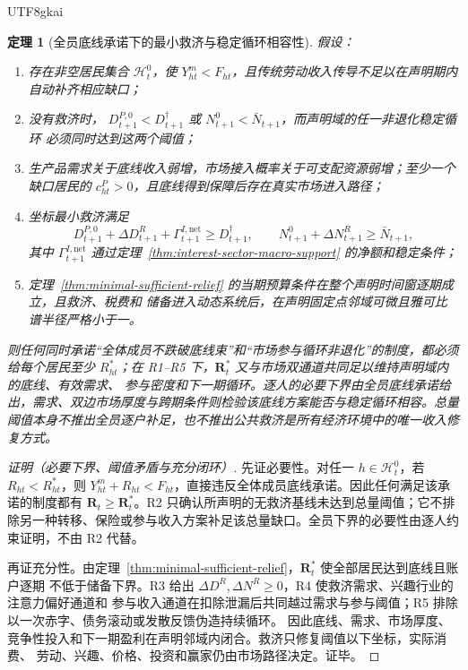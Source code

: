 \documentclass[12pt,a4paper,openany]{report}
\newtheorem{theorem}{定理}[chapter]
\begin{document}
\begin{CJK*}{UTF8}{gkai}
\begin{theorem}[全员底线承诺下的最小救济与稳定循环相容性]
\label{thm:relief-endogenous-stability}
假设：
\begin{enumerate}[label=\textup{(R\arabic*)},leftmargin=4em]
  \item 存在非空居民集合 \(\mathcal H_t^0\)，使 \(Y_{ht}^{m}<F_{ht}\)，且传统劳动收入传导不足以在声明期内
  自动补齐相应缺口；
  \item 没有救济时，
  \(D_{t+1}^{P,0}<D_{t+1}^{\dagger}\) 或 \(N_{t+1}^{0}<\bar N_{t+1}\)，而声明域的任一非退化稳定循环
  必须同时达到这两个阈值；
  \item 生产品需求关于底线收入弱增，市场接入概率关于可支配资源弱增；至少一个缺口居民的
  \(c_{ht}^{P}>0\)，且底线得到保障后存在真实市场进入路径；
  \item 坐标最小救济满足
  \[
    D_{t+1}^{P,0}+\Delta D_{t+1}^{R}
    +\Gamma_{t+1}^{I,\mathrm{net}}
    \ge D_{t+1}^{\dagger},
    \qquad
    N_{t+1}^{0}+\Delta N_{t+1}^{R}
    \ge\bar N_{t+1},
  \]
  其中 \(\Gamma_{t+1}^{I,\mathrm{net}}\) 通过定理~\ref{thm:interest-sector-macro-support} 的净额和稳定条件；
  \item 定理~\ref{thm:minimal-sufficient-relief} 的当期预算条件在整个声明时间窗逐期成立，且救济、税费和
  储备进入动态系统后，在声明固定点邻域可微且雅可比谱半径严格小于一。
\end{enumerate}
则任何同时承诺“全体成员不跌破底线束”和“市场参与循环非退化”的制度，都必须给每个居民至少
\(R_{ht}^{*}\)；在 R1--R5 下，\(\mathbf R_t^*\) 又与市场双通道共同足以维持声明域内的底线、有效需求、
参与密度和下一期循环。逐人的必要下界由全员底线承诺给出，需求、双边市场厚度与跨期条件则检验该底线方案能否与稳定循环相容。总量阈值本身不推出全员逐户补足，也不推出公共救济是所有经济环境中的唯一收入修复方式。
\end{theorem}

\begin{proof}[证明（必要下界、阈值矛盾与充分闭环）]
先证必要性。对任一 \(h\in\mathcal H_t^0\)，若 \(R_{ht}<R_{ht}^{*}\)，则
\(Y_{ht}^{m}+R_{ht}<F_{ht}\)，直接违反全体成员底线承诺。因此任何满足该承诺的制度都有
\(\mathbf R_t\ge\mathbf R_t^*\)。R2 只确认所声明的无救济基线未达到总量阈值；它不排除另一种转移、保险或参与收入方案补足该总量缺口。全员下界的必要性由逐人约束证明，不由 R2 代替。

再证充分性。由定理~\ref{thm:minimal-sufficient-relief}，\(\mathbf R_t^*\) 使全部居民达到底线且账户逐期
不低于储备下界。R3 给出 \(\Delta D^R,\Delta N^R\ge0\)，R4 使救济需求、兴趣行业的注意力偏好通道和
参与收入通道在扣除泄漏后共同越过需求与参与阈值；R5 排除以一次赤字、债务滚动或发散反馈伪造持续循环。
因此底线、需求、市场厚度、竞争性投入和下一期盈利在声明邻域内闭合。救济只修复阈值以下坐标，实际消费、
劳动、兴趣、价格、投资和赢家仍由市场路径决定。证毕。
\end{proof}


\end{CJK*}
\end{document}

